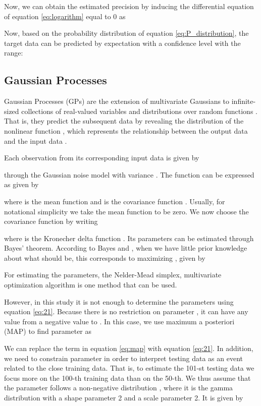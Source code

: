 \documentclass[final,authoryear,5p,times,twocolumn]{elsarticle}
\begin{document}
Now, we can obtain the estimated precision by inducing the differential equation of equation \eqref{eq:logarithm} equal to 0 as


Now, based on the probability distribution of equation \eqref{eq:P_distribution}, the target data  can be predicted by expectation  with a  confidence level with the range:




\subsection{Gaussian Processes}
\label{section:Sec3.2}
Gaussian Processes (GPs) are the extension of multivariate Gaussians to infinite-sized collections of real-valued variables and distributions over random functions \citep{GP08}. That is, they predict the subsequent data by revealing the distribution of the nonlinear function , which represents the relationship between the output data  and the input data .

Each observation  from its corresponding input data  is given by

through the Gaussian noise model with variance . The function  can be expressed as  given by

where  is the mean function and  is the covariance function \citep{GP08}. Usually, for notational simplicity we take the mean function to be zero. We now choose the covariance function by writing
 
where is the Kronecher delta function \citep{Gaussian06}. Its parameters  can be estimated through Bayes' theorem. According to Bayes and \citet{Gaussian06}, when we have little prior knowledge about what  should be, this corresponds to maximizing , given by

For estimating the parameters, the Nelder-Mead simplex, multivariate optimization algorithm \citep{ref20} is one method that can be used.

However, in this study it is not enough to determine the parameters using equation \eqref{eq:21}. Because there is no restriction on parameter , it can have any value from a negative value to . In this case, we use maximum a posteriori (MAP) to find parameter  as
 
We can replace the term  in equation \eqref{eq:map} with equation \eqref{eq:21}. In addition, we need to constrain parameter  in order to interpret testing data  as an event related to the close training data. That is, to estimate the 101-st testing data we focus more on the 100-th training data than on the 50-th. We thus assume that the parameter  follows a non-negative distribution , where it is the gamma distribution with a shape parameter 2 and a scale parameter 2. It is given by
\end{document}
